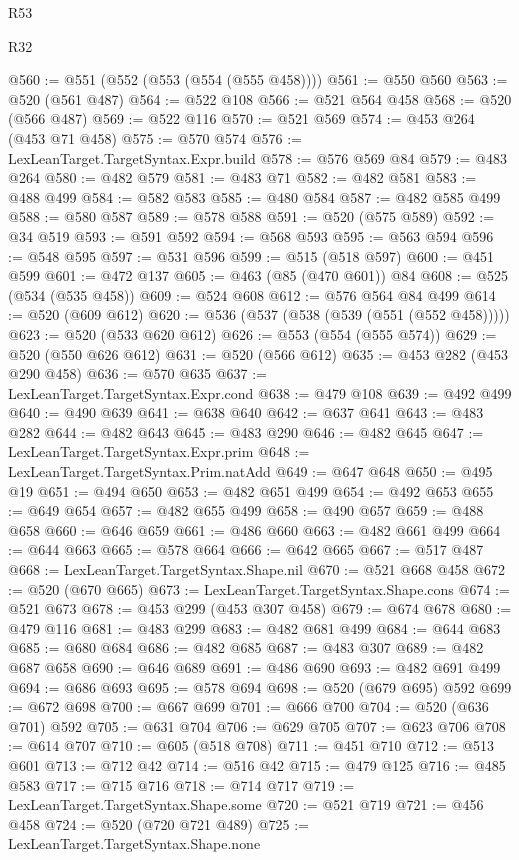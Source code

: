 \begin{lexlean}{R53}
\begin{lexlean}{R32}
\begin{coremodule}
{{{{{{{{{{{{{{{{{{{{{{{{{{{{{{{{{{{{{{{{{{{{{{{{{{{@560 := @551 (@552 (@553 (@554 (@555 @458))))
@561 := @550 @560
@563 := @520 (@561 @487)
@564 := @522 @108
@566 := @521 @564 @458
@568 := @520 (@566 @487)
@569 := @522 @116
@570 := @521 @569
@574 := @453 @264 (@453 @71 @458)
@575 := @570 @574
@576 := LexLeanTarget.TargetSyntax.Expr.build
@578 := @576 @569 @84
@579 := @483 @264
@580 := @482 @579
@581 := @483 @71
@582 := @482 @581
@583 := @488 @499
@584 := @582 @583
@585 := @480 @584
@587 := @482 @585 @499
@588 := @580 @587
@589 := @578 @588
@591 := @520 (@575 @589)
@592 := @34 @519
@593 := @591 @592
@594 := @568 @593
@595 := @563 @594
@596 := @548 @595
@597 := @531 @596
@599 := @515 (@518 @597)
@600 := @451 @599
@601 := @472 @137
@605 := @463 (@85 (@470 @601)) @84
@608 := @525 (@534 (@535 @458))
@609 := @524 @608
@612 := @576 @564 @84 @499
@614 := @520 (@609 @612)
@620 := @536 (@537 (@538 (@539 (@551 (@552 @458)))))
@623 := @520 (@533 @620 @612)
@626 := @553 (@554 (@555 @574))
@629 := @520 (@550 @626 @612)
@631 := @520 (@566 @612)
@635 := @453 @282 (@453 @290 @458)
@636 := @570 @635
@637 := LexLeanTarget.TargetSyntax.Expr.cond
@638 := @479 @108
@639 := @492 @499
@640 := @490 @639
@641 := @638 @640
@642 := @637 @641
@643 := @483 @282
@644 := @482 @643
@645 := @483 @290
@646 := @482 @645
@647 := LexLeanTarget.TargetSyntax.Expr.prim
@648 := LexLeanTarget.TargetSyntax.Prim.natAdd
@649 := @647 @648
@650 := @495 @19
@651 := @494 @650
@653 := @482 @651 @499
@654 := @492 @653
@655 := @649 @654
@657 := @482 @655 @499
@658 := @490 @657
@659 := @488 @658
@660 := @646 @659
@661 := @486 @660
@663 := @482 @661 @499
@664 := @644 @663
@665 := @578 @664
@666 := @642 @665
@667 := @517 @487
@668 := LexLeanTarget.TargetSyntax.Shape.nil
@670 := @521 @668 @458
@672 := @520 (@670 @665)
@673 := LexLeanTarget.TargetSyntax.Shape.cons
@674 := @521 @673
@678 := @453 @299 (@453 @307 @458)
@679 := @674 @678
@680 := @479 @116
@681 := @483 @299
@683 := @482 @681 @499
@684 := @644 @683
@685 := @680 @684
@686 := @482 @685
@687 := @483 @307
@689 := @482 @687 @658
@690 := @646 @689
@691 := @486 @690
@693 := @482 @691 @499
@694 := @686 @693
@695 := @578 @694
@698 := @520 (@679 @695) @592
@699 := @672 @698
@700 := @667 @699
@701 := @666 @700
@704 := @520 (@636 @701) @592
@705 := @631 @704
@706 := @629 @705
@707 := @623 @706
@708 := @614 @707
@710 := @605 (@518 @708)
@711 := @451 @710
@712 := @513 @601
@713 := @712 @42
@714 := @516 @42
@715 := @479 @125
@716 := @485 @583
@717 := @715 @716
@718 := @714 @717
@719 := LexLeanTarget.TargetSyntax.Shape.some
@720 := @521 @719
@721 := @456 @458
@724 := @520 (@720 @721 @489)
@725 := LexLeanTarget.TargetSyntax.Shape.none
}}}}}}}}}}}}}}}}}}}}}}}}}}}}}}}}}}}}}}}}}}}}}}}}}}}
\end{coremodule}
\end{lexlean}
\end{lexlean}
